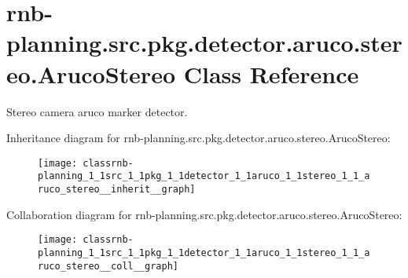 \hypertarget{classrnb-planning_1_1src_1_1pkg_1_1detector_1_1aruco_1_1stereo_1_1_aruco_stereo}{}\section{rnb-\/planning.src.\+pkg.\+detector.\+aruco.\+stereo.\+Aruco\+Stereo Class Reference}
\label{classrnb-planning_1_1src_1_1pkg_1_1detector_1_1aruco_1_1stereo_1_1_aruco_stereo}


Stereo camera aruco marker detector.  




Inheritance diagram for rnb-\/planning.src.\+pkg.\+detector.\+aruco.\+stereo.\+Aruco\+Stereo\+:
\nopagebreak
\begin{figure}[H]
\begin{center}
\leavevmode
\texttt{[image: classrnb-planning\_1\_1src\_1\_1pkg\_1\_1detector\_1\_1aruco\_1\_1stereo\_1\_1\_aruco\_stereo\_\_inherit\_\_graph]}
\end{center}
\end{figure}


Collaboration diagram for rnb-\/planning.src.\+pkg.\+detector.\+aruco.\+stereo.\+Aruco\+Stereo\+:
\nopagebreak
\begin{figure}[H]
\begin{center}
\leavevmode
\texttt{[image: classrnb-planning\_1\_1src\_1\_1pkg\_1\_1detector\_1\_1aruco\_1\_1stereo\_1\_1\_aruco\_stereo\_\_coll\_\_graph]}
\end{center}
\end{figure}

